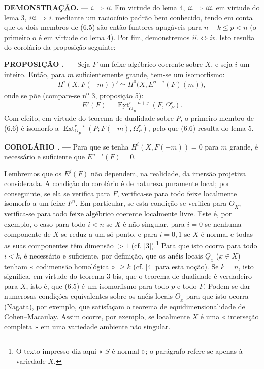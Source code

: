 \documentclass[11pt,twoside,openany]{book}
\numberwithin{equation}{section}
\newcommand{\src}[1]{%
  \phantomsection\hypertarget{src:#1}{}%
  \marginpar{\raggedleft\footnotesize\sffamily #1}%
}
\newcommand{\Osh}{\underline{O}}
\newcommand{\Extsh}{\underline{\operatorname{Ext}}}
\theoremstyle{plain}
\theoremstyle{definition}
\theoremstyle{remark}
\newcommand{\result}[2]{%
  \par\medskip\noindent\textbf{#1%
  \if\relax\detokenize{#2}\relax\else\space#2\fi. ---}\enspace
}
\newcommand{\FgaUnitKey}{frontmatter}
\renewcommand{\src}[1]{%
  \phantomsection\hypertarget{src:\FgaUnitKey:#1}{}%
  \marginpar{\raggedleft\footnotesize\sffamily #1}%
}
\begin{document}
\noindent\textbf{DEMONSTRAÇÃO.} --- \textit{i.}$\Rightarrow$\textit{ii.} Em
virtude do lema 4, \textit{ii.}$\Rightarrow$\textit{iii.} em virtude do lema 3,
\textit{iii.}$\Rightarrow$\textit{i.} mediante um raciocínio padrão bem conhecido,
tendo em conta que os dois membros de (6.5) são então funtores apagáveis
para $n-k\leq p<n$ (o primeiro o é em virtude do lema 4). Por fim, demonstremos
\textit{ii.}$\Leftrightarrow$\textit{iv.} Isto resulta do corolário da
proposição seguinte:

\result{PROPOSIÇÃO}{6} Seja $F$ um feixe algébrico coerente sobre $X$, e
seja $i$ um inteiro. Então, para $m$ suficientemente grande, tem-se um isomorfismo:
\begin{equation}\tag{6.6}
  H^{i}(X,F(-m))'
  \simeq H^{0}\bigl(X,E^{n-i}(F)(m)\bigr),
\end{equation}
onde se põe (compare-se n\textsuperscript{o} 3, proposição 5):
\begin{equation}\tag{6.7}
  E^{j}(F)=\Extsh_{\Osh_P}^{r-n+j}(F,\Omega_P^{r}).
\end{equation}
Com efeito, em virtude do teorema de dualidade sobre $P$, o primeiro membro de (6.6)
é isomorfo a
$\operatorname{Ext}_{\Osh_P}^{r-i}(P;F(-m),\Omega_P^{r})$, pelo que (6.6) resulta
do lema 5.

\src{187}
\result{COROLÁRIO}{} Para que se tenha $H^{i}(X,F(-m))=0$ para $m$ grande, é
necessário e suficiente que $E^{n-i}(F)=0$.

Lembremos que os $E^{j}(F)$ não dependem, na realidade, da imersão projetiva
considerada. A condição do corolário é de natureza puramente local; por conseguinte,
se ela se verifica para $F$, verifica-se para todo feixe localmente
isomorfo a um feixe $F^{n}$. Em particular, se esta condição se verifica
para $\Osh_X$, verifica-se para todo feixe algébrico coerente localmente
livre. Este é, por exemplo, o caso para todo $i<n$ se $X$ é não singular, para
$i=0$ se nenhuma componente de $X$ se reduz a um só ponto, e para $i=0,1$
se $X$ é normal e todas as suas componentes têm dimensão $>1$ (cf.
[3]).\footnote{O texto impresso diz aqui « $S$ é normal »; o parágrafo
refere-se apenas à variedade $X$.} Para que isto ocorra para todo
$i<k$, é necessário e suficiente, por definição, que os anéis locais
$\Osh_x$ ($x\in X$) tenham « codimensão homológica » $\geq k$ (cf. [4]
para esta noção). Se $k=n$, isto significa, em virtude do teorema 3 bis, que o
teorema de dualidade é verdadeiro para $X$, isto é, que (6.5) é um isomorfismo para
todo $p$ e todo $F$. Podem-se dar numerosas condições equivalentes sobre
os anéis locais $\Osh_x$ para que isto ocorra (Nagata), por exemplo, que
satisfaçam o teorema de equidimensionalidade de Cohen--Macaulay. Assim ocorre,
por exemplo, se localmente $X$ é uma « interseção completa » em uma
variedade ambiente não singular.
\end{document}
